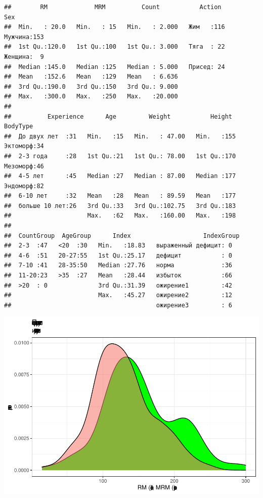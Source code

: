 \documentclass[
]{article}
\begin{document}
\begin{verbatim}
##        RM             MRM          Count           Action         Sex     
##  Min.   : 20.0   Min.   : 15   Min.   : 2.000   Жим   :116   Мужчина:153  
##  1st Qu.:120.0   1st Qu.:100   1st Qu.: 3.000   Тяга  : 22   Женщина:  9  
##  Median :145.0   Median :125   Median : 5.000   Присед: 24                
##  Mean   :152.6   Mean   :129   Mean   : 6.636                             
##  3rd Qu.:190.0   3rd Qu.:150   3rd Qu.: 9.000                             
##  Max.   :300.0   Max.   :250   Max.   :20.000                             
##                                                                           
##          Experience      Age         Weight           Height        BodyType 
##  До двух лет  :31   Min.   :15   Min.   : 47.00   Min.   :155   Эктоморф:34  
##  2-3 года     :28   1st Qu.:21   1st Qu.: 78.00   1st Qu.:170   Мезоморф:46  
##  4-5 лет      :45   Median :27   Median : 87.00   Median :177   Эндоморф:82  
##  6-10 лет     :32   Mean   :28   Mean   : 89.59   Mean   :177                
##  больше 10 лет:26   3rd Qu.:33   3rd Qu.:102.75   3rd Qu.:183                
##                     Max.   :62   Max.   :160.00   Max.   :198                
##                                                                              
##  CountGroup  AgeGroup      Index                    IndexGroup
##  2-3  :47   <20  :30   Min.   :18.83   выраженный дефицит: 0  
##  4-6  :51   20-27:55   1st Qu.:25.17   дефицит           : 0  
##  7-10 :41   28-35:50   Median :27.76   норма             :36  
##  11-20:23   >35  :27   Mean   :28.44   избыток           :66  
##  >20  : 0              3rd Qu.:31.39   ожирение1         :42  
##                        Max.   :45.27   ожирение2         :12  
##                                        ожирение3         : 6
\end{verbatim}

\begin{center}\includegraphics[width=0.85\linewidth]{Regression-model-for-estimating-RM_files/figure-latex/unnamed-chunk-26-1} \end{center}
\end{document}
